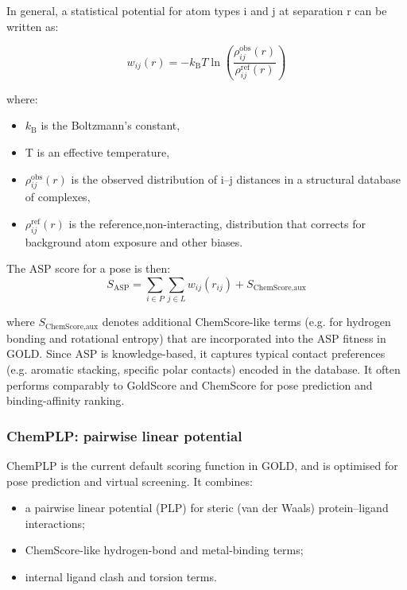 \documentclass[12pt]{article}
\begin{document}
In general, a statistical potential for atom types i and j at separation r can be written as:

\begin{equation}
w_{ij}(r)
=
- k_{\textrm{B}} T
\ln
\left(
\frac{\rho_{ij}^{\textrm{obs}}(r)}{\rho_{ij}^{\textrm{ref}}(r)}
\right)
\label{eq:ASP}
\end{equation}

where:
\begin{itemize}
    \item $k_{\textrm{B}}$ is the Boltzmann's constant,
    \item T is an effective temperature,
    \item $\rho_{ij}^{\textrm{obs}}(r)$ is the observed distribution of i--j distances in a structural database of complexes,
    \item $\rho_{ij}^{\textrm{ref}}(r)$ is the reference,non-interacting, distribution that corrects for background atom exposure and other biases. 
\end{itemize}

The ASP score for a pose is then:
\begin{equation}
S_{\textrm{ASP}}
=
\sum_{i \in P}\sum_{j \in L}
w_{ij}(r_{ij})
+
S_{\textrm{ChemScore,aux}}
\end{equation}

where 
$S_{\textrm{ChemScore,aux}}$ denotes additional ChemScore-like terms (e.g. for hydrogen bonding and rotational entropy) that are incorporated into the ASP fitness in GOLD. Since ASP is knowledge-based, it captures typical contact preferences (e.g. aromatic stacking, specific polar contacts) encoded in the database. It often performs comparably to GoldScore and ChemScore for pose prediction and binding-affinity ranking\cite{CH7_Mooij2005}.

\subsubsection{ChemPLP: pairwise linear potential}

ChemPLP is the current default scoring function in GOLD, and is optimised for pose prediction and virtual screening. 
It combines:
\begin{itemize}
    \item a pairwise linear potential (PLP) for steric (van der Waals) protein–ligand interactions;
    \item ChemScore-like hydrogen-bond and metal-binding terms;
    \item internal ligand clash and torsion terms.
\end{itemize}
\end{document}
